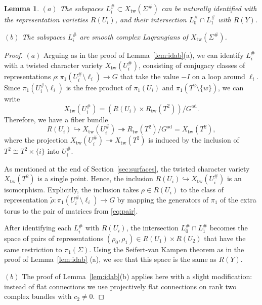 \documentclass [11pt]{amsart}
\newtheorem {lemma}[theorem]{Lemma}
\theoremstyle{remark}
\def\Gad{G^{\operatorname{ad}}}
\def\Rep {R}
\def\Char {X}
\def\Reptw{\Rep_{\operatorname{tw}}}
\def\Xtw{\Char_{\operatorname{tw}}}
\begin{document}
\begin{lemma}
$(a)$ The subspaces $L^{\#}_i \subset \Xtw(\Sigma^{\#})$ can be naturally identified with the representation varieties $\Rep(U_i)$, and their intersection $L^{\#}_0 \cap L^{\#}_1$ with $\Rep(Y)$.

$(b)$ The subspaces $L^{\#}_i$ are smooth complex Lagrangians of $\Xtw(\Sigma^{\#})$. 
\end{lemma}
 
 \begin{proof}
 $(a)$ Arguing as in the proof of Lemma~\ref{lem:idab}(a), we can identify $L^{\#}_i$ with a twisted character variety $\Xtw(U^{\#}_i)$, consisting of conjugacy classes of representations $\rho: \pi_1(U^{\#}_i \setminus \ell_i) \to G$ that take the value $-I$ on a loop around $\ell_i$. Since $\pi_1(U^{\#}_i \setminus \ell_i)$ is the free product of $\pi_1(U_i)$ and $\pi_1(T^2 \setminus \{w\})$,  we can write
 $$\Xtw(U^{\#}_i) = (\Rep(U_i) \times \Reptw(T^2))/\Gad.$$
Therefore, we have a fiber bundle
\begin{equation}
\label{eq:RT}
 \Rep(U_i) \hookrightarrow \Xtw(U^{\#}_i) \twoheadrightarrow \Reptw(T^2)/\Gad = \Xtw(T^2),
 \end{equation}
where the projection $\Xtw(U^{\#}_i) \twoheadrightarrow \Xtw(T^2)$ is induced by the inclusion of $T^2 \cong T^2 \times \{i\}$ into $U^{\#}_i$.

As mentioned at the end of Section~\ref{sec:surfaces}, the twisted character variety $  \Xtw(T^2)$ is a single point. Hence, the inclusion $\Rep(U_i)  \hookrightarrow \Xtw(U^{\#}_i)$ is an isomorphism. Explicitly, the inclusion takes $\rho \in \Rep(U_i)$ to the class of representation $\tilde \rho:\pi_1(U^{\#}_i \setminus \ell_i) \to G$ by mapping the generators of $\pi_1$ of the extra torus to the pair of matrices from \eqref{eq:pair}.
 
After identifying each $L^{\#}_i$ with $\Rep(U_i)$, the intersection $L^{\#}_0 \cap L^{\#}_1$ becomes the space of pairs of representations $(\rho_0, \rho_1) \in \Rep(U_1) \times \Rep(U_2)$ that have the same restriction to $\pi_1(\Sigma)$. Using the Seifert-van Kampen theorem as in the proof of Lemma~\ref{lem:idab} (a), we see that this space is  
the same as $\Rep(Y)$.
 
$(b)$ The proof of Lemma~\ref{lem:idab}(b) applies here with a slight modification: instead of flat connections we use projectively flat connections on rank two complex bundles with $c_2 \neq 0$.
 \end{proof}
 
\end{document}
